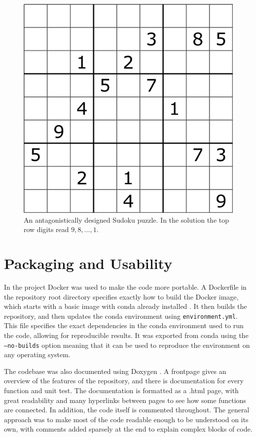 \documentclass[12pt]{article}
\begin{document}
\begin{figure}[hbt]
    \includegraphics[scale=0.3]{Sudoku_puzzle_hard_for_brute_force.png}
    \caption{An antagonistically designed Sudoku puzzle. In the solution the top row digits read $9, 8, \ldots, 1$\cite{antagonist}.}
    \label{antagonist_clues}
\end{figure}

\section{Packaging and Usability}

In the project Docker was used to make the code more portable.
A Dockerfile in the repository root directory specifies exactly how to build the Docker image, which starts with a basic image with conda already installed \cite{docker}.
It then builds the repository, and then updates the conda environment using \texttt{environment.yml}.
This file specifies the exact dependencies in the conda environment used to run the code, allowing for reproducible results.
It was exported from conda using the \texttt{--no-builds} option meaning that it can be used to reproduce the environment on any operating system.

The codebase was also documented using Doxygen \cite{doxygen}.
A frontpage gives an overview of the features of the repository, and there is documentation for every function and unit test.
The documentation is formatted as a .html page, with great readability and many hyperlinks between pages to see how some functions are connected.
In addition, the code itself is commented throughout.
The general approach was to make most of the code readable enough to be understood on its own, with comments added sparsely at the end to explain complex blocks of code.
\end{document}
